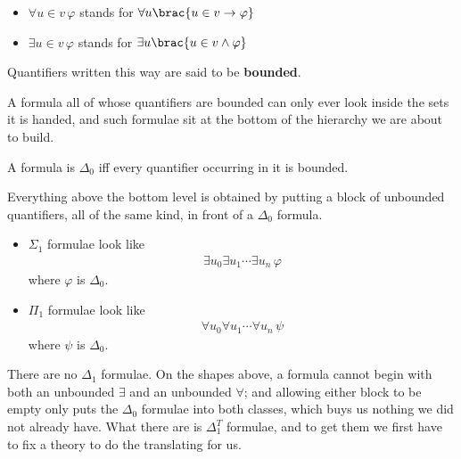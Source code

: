 \begin{boxnotation} \hfill
    \begin{itemize}
        \item $\forall u \in v \, \varphi$ stands for $\forall u \brac{u \in v \to \varphi}$

        \item $\exists u \in v \, \varphi$ stands for $\exists u \brac{u \in v \land \varphi}$
    \end{itemize}
    Quantifiers written this way are said to be \textbf{bounded}.
\end{boxnotation}

A formula all of whose quantifiers are bounded can only ever look inside the sets it is handed, and such formulae sit at the bottom of the hierarchy we are about to build.

\begin{boxdefinition}
    A formula is $\Delta_0$ iff every quantifier occurring in it is bounded.
\end{boxdefinition}

Everything above the bottom level is obtained by putting a block of unbounded quantifiers, all of the same kind, in front of a $\Delta_0$ formula.

\begin{boxdefinition} \hfill
    \begin{itemize}
        \item $\Sigma_1$ formulae look like
        \begin{align*}
            \exists u_0 \exists u_1 \cdots \exists u_n \, \varphi
        \end{align*}
        where $\varphi$ is $\Delta_0$.

        \item $\Pi_1$ formulae look like
        \begin{align*}
            \forall u_0 \forall u_1 \cdots \forall u_n \, \psi
        \end{align*}
        where $\psi$ is $\Delta_0$.
    \end{itemize}
\end{boxdefinition}

There are no $\Delta_1$ formulae. On the shapes above, a formula cannot begin with both an unbounded $\exists$ and an unbounded $\forall$; and allowing either block to be empty only puts the $\Delta_0$ formulae into both classes, which buys us nothing we did not already have. What there are is $\Delta_1^T$ formulae, and to get them we first have to fix a theory to do the translating for us.

